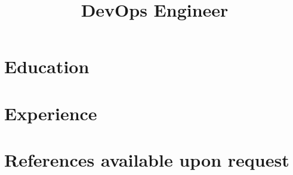 \documentclass[11pt,a4paper,sans]{moderncv}
\title{DevOps Engineer}
\begin{document}
\makecvtitle

\section{Education}

\section{Experience}

\section{References available upon request}
\end{document}
